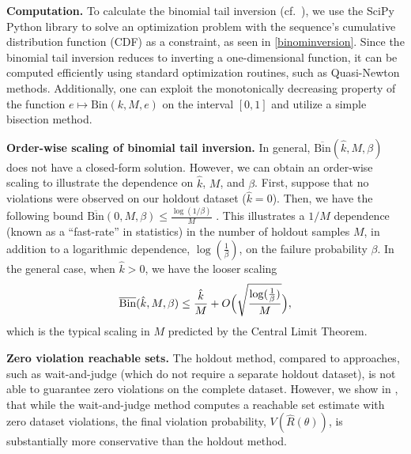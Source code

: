 \documentclass[letterpaper, 10 pt, conference]{ieeeconf}  %
\begin{document}
\textbf{Computation.}
To calculate the binomial tail inversion (cf.~), we use the SciPy Python library to solve an optimization problem with the sequence's cumulative distribution function (CDF) as a constraint, as seen in \eqref{binominversion}. 
Since the binomial tail inversion reduces to inverting a one-dimensional function, it can be computed efficiently using standard optimization routines, such as Quasi-Newton methods. 
Additionally, one can exploit the monotonically decreasing
property of the function $e \mapsto \mathrm{Bin}(k, M, e)$ on the interval $[0, 1]$ and utilize a simple bisection method.

\textbf{Order-wise scaling of binomial tail inversion.}
In general, $\overline{\text{Bin}}(\hat{k}, M, \beta)$ does not have a closed-form solution. However, we can obtain an order-wise scaling to illustrate the dependence on $\hat{k}$, $M$, and $\beta$.
First, suppose that no violations were observed on our holdout dataset ($\hat{k}=0$). 
Then, we have the following bound $\overline{\text{Bin}}(0, M, \beta) \leq \frac{\log(1/\beta)}{M}$ \cite[Corollary 3.4]{langford2005tutorial}. This illustrates a $1/M$ dependence (known as a ``fast-rate'' in statistics) in the number of holdout samples $M$, in addition to a logarithmic dependence, $\log(\frac{1}{\beta} )$, on the failure probability $\beta$. In the general case, when $\hat{k} > 0$, we have the looser scaling
\begin{equation}
    \overline{\text{Bin}}(\hat{k}, M, \beta) \leq \frac{\hat{k}}{M} + O\Bigl(\sqrt{\frac{\log(\frac{1}{\beta})}{M}}\Bigr),
\end{equation}
which is the typical scaling in $M$ predicted by the Central Limit Theorem.

\textbf{Zero violation reachable sets.}
The holdout method, compared to approaches, such as wait-and-judge (which do not require a separate holdout dataset), is not able to guarantee zero violations on the complete dataset. However, we show in , that while the wait-and-judge method computes a reachable set estimate with zero dataset violations, the final violation probability, $V(\hat{R}(\theta))$, is substantially more conservative than the holdout method.
\end{document}
